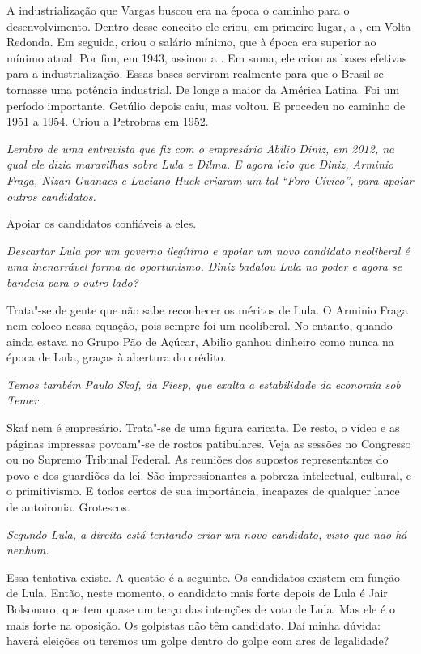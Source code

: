 \normalfont
A industrialização que Vargas buscou era na época o
caminho para o desenvolvimento. Dentro desse conceito ele criou, em
primeiro lugar, a , em Volta Redonda. Em seguida, criou o salário
mínimo, que à época era superior ao mínimo atual. Por fim, em 1943,
assinou a . Em suma, ele criou as bases efetivas para a
industrialização. Essas bases serviram realmente para que o Brasil se
tornasse uma potência industrial. De longe a maior da América Latina.
Foi um período importante. Getúlio depois caiu, mas voltou. E procedeu
no caminho de 1951 a 1954. Criou a Petrobras em 1952.

\itshape
 Lembro de uma entrevista que fiz com o empresário
Abilio Diniz, em 2012, na qual ele dizia maravilhas sobre Lula e Dilma.
E agora leio que Diniz, Arminio Fraga, Nizan Guanaes e Luciano Huck
criaram um tal ``Foro Cívico'', para apoiar outros candidatos.

\normalfont
Apoiar os candidatos confiáveis a eles.

\itshape
 Descartar Lula por um governo ilegítimo e apoiar um
novo candidato neoliberal é uma inenarrável forma de oportunismo. Diniz
badalou Lula no poder e agora se bandeia para o outro lado?

\normalfont
Trata"-se de gente que não sabe reconhecer os méritos de
Lula. O Arminio Fraga nem coloco nessa equação, pois sempre foi um
neoliberal. No entanto, quando ainda estava no Grupo Pão de Açúcar,
Abilio ganhou dinheiro como nunca na época de Lula, graças à abertura do
crédito.

\itshape
 Temos também Paulo Skaf, da Fiesp, que exalta a
estabilidade da economia sob Temer.

\normalfont
Skaf nem é empresário. Trata"-se de uma figura caricata.
De resto, o vídeo e as páginas impressas povoam"-se de rostos
patibulares. Veja as sessões no Congresso ou no Supremo Tribunal
Federal. As reuniões dos supostos representantes do povo e dos guardiões
da lei. São impressionantes a pobreza intelectual, cultural, e o
primitivismo. E todos certos de sua importância, incapazes de qualquer
lance de autoironia. Grotescos.

\itshape
 Segundo Lula, a direita está tentando criar um novo
candidato, visto que não há nenhum.

\normalfont
Essa tentativa existe. A questão é a seguinte. Os
candidatos existem em função de Lula. Então, neste momento, o candidato
mais forte depois de Lula é Jair Bolsonaro, que tem quase um terço das
intenções de voto de Lula. Mas ele é o mais forte na oposição. Os
golpistas não têm candidato. Daí minha dúvida: haverá eleições ou
teremos um golpe dentro do golpe com ares de legalidade?

